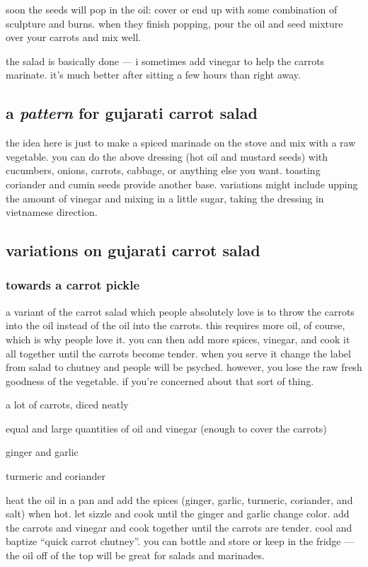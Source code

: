 soon the seeds will pop in the oil: cover or end up with some combination of 
sculpture and burns. when they finish popping, pour the oil and seed mixture 
over your carrots and mix well.

the salad is basically done --- i sometimes add vinegar to help the carrots 
marinate. it's much better after sitting a few hours than right away.

\subsection{a \textit{pattern} for gujarati carrot salad}

the idea here is just to make a spiced marinade on the stove and mix with a raw 
vegetable. you can do the above dressing (hot oil and mustard seeds) with 
cucumbers, onions, carrots, cabbage, or anything else you want. toasting 
coriander and cumin seeds provide another base. variations might include upping 
the amount of vinegar and mixing in a little sugar, taking the dressing in 
vietnamese direction.

\subsection{variations on gujarati carrot salad}

\subsubsection{towards a carrot pickle}

a variant of the carrot salad which people absolutely love is to throw the 
carrots into the oil instead of the oil into the carrots. this requires more 
oil, of course, which is why people love it. you can then add more spices, 
vinegar, and cook it all together until the carrots become tender. when you 
serve it change the label from salad to chutney and people will be psyched. 
however, you lose the raw fresh goodness of the vegetable. if you're concerned 
about that sort of thing.

\begin{ingredients}
  \item a lot of carrots, diced neatly
  \item equal and large quantities of oil and vinegar (enough to cover the carrots)
  \item ginger and garlic
  \item turmeric and coriander
\end{ingredients}

heat the oil in a pan and add the spices (ginger, garlic, turmeric, coriander, 
and salt) when hot. let sizzle and cook until the ginger and garlic change 
color. add the carrots and vinegar and cook together until the carrots are 
tender. cool and baptize ``quick carrot chutney''. you can bottle and store or 
keep in the fridge --- the oil off of the top will be great for salads and 
marinades.
